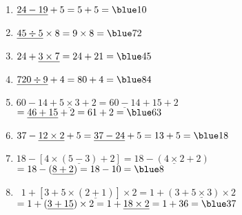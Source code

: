    \ \\ [-5mm]
   \begin{enumerate}
      \item $\underline{24-19}+5 =5+5 =\blue 10$ \smallskip
      \item $\underline{45\div5}\times8 =9\times8 =\blue 72$ \smallskip
      \item $24+\underline{3\times7} =24+21 =\blue 45$ \smallskip
      \item $\underline{720\div9}+4 =80+4 =\blue 84$ \smallskip
      \item $60-14+\underline{5\times3}+2 =\underline{60-14}+15+2$ \\
         \quad $=\underline{46+15}+2 =61+2 =\blue 63$ \smallskip
      \item $37-\underline{12\times2}+5 =\underline{37-24}+5 =13+5 =\blue 18$ \smallskip
      \item $18-[4\times(\underline{5-3})+2] =18-(\underline{4\times2}+2)$ \\
         \quad $=18-(\underline{8+2}) =18-10 =\blue 8$ \smallskip
      \item \, $1+[3+5\times(\underline{2+1})]\times2 =1+(3+\underline{5\times3})\times2$ \\
         \quad $=1+(\underline{3+15})\times2 =1+\underline{18\times2} =1+36 =\blue 37$
   \end{enumerate}
